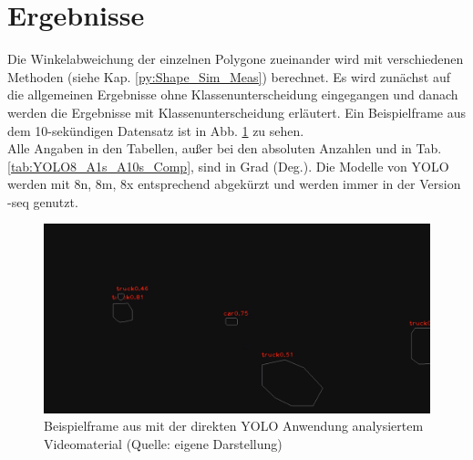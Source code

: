 \section{Ergebnisse\label{sec:Ergebnisse}} 
{Die Winkelabweichung der einzelnen Polygone zueinander wird mit verschiedenen Methoden  (siehe Kap. \ref{py:Shape_Sim_Meas}) berechnet. Es wird zunächst auf die allgemeinen Ergebnisse ohne Klassenunterscheidung eingegangen und danach werden die Ergebnisse mit Klassenunterscheidung erläutert. Ein Beispielframe aus dem 10-sekündigen Datensatz ist in Abb. \ref{Bsp_ErgebRVA10s_Vidmat} zu sehen.\\
Alle Angaben in den Tabellen, außer bei den absoluten Anzahlen und in Tab. \ref{tab:YOLO8_A1s_A10s_Comp}, sind in Grad (Deg.). Die Modelle von YOLO werden mit 8n, 8m, 8x entsprechend abgekürzt und werden immer in der Version \glqq -seq \grqq{} genutzt.}
\begin{figure}[ht]
	\centering
	\includegraphics*[scale = 0.35, keepaspectratio ]{images/Evaluation/Screenshot_A10s_RV.png}
	\caption[Beispielframe aus mit der direkten YOLO Anwendung analysiertem Videomaterial]{Beispielframe aus mit der direkten YOLO Anwendung analysiertem Videomaterial (Quelle: eigene Darstellung)} 
	\label{Bsp_ErgebRVA10s_Vidmat}
\end{figure}
